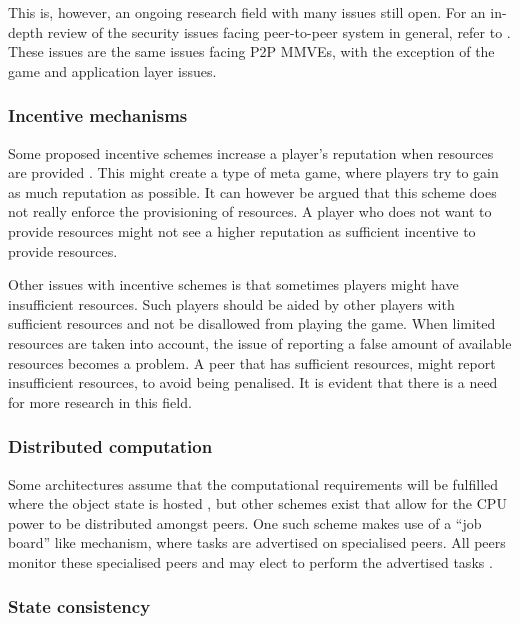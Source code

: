 This is, however, an ongoing research field with many issues still open. For an in-depth review of the security issues facing peer-to-peer system in general, refer to \cite{p2p_security_issues}. These issues are the same issues facing P2P MMVEs, with the exception of the game and application layer issues.

\subsubsection{Incentive mechanisms}

Some proposed incentive schemes increase a player's reputation when resources are provided  \cite{classic_p2p_reputation} \cite{proactive_reputation}. This might create a type of meta game, where players try to gain as much reputation as possible. It can however be argued that this scheme does not really enforce the provisioning of resources. A player who does not want to provide resources might not see a higher reputation as sufficient incentive to provide resources.

Other issues with incentive schemes is that sometimes players might have insufficient resources. Such players should be aided by other players with sufficient resources and not be disallowed from playing the game. When limited resources are taken into account, the issue of reporting a false amount of available resources becomes a problem. A peer that has sufficient resources, might report insufficient resources, to avoid being penalised. It is evident that there is a need for more research in this field.

\subsubsection{Distributed computation}
\label{distributed_computing_challenge}

Some architectures assume that the computational requirements will be fulfilled where the object state is hosted \cite{solipsis}, but other schemes exist that allow for the CPU power to be distributed amongst peers. One such scheme makes use of a ``job board'' like mechanism, where tasks are advertised on specialised peers. All peers monitor these specialised peers and may elect to perform the advertised tasks \cite{fan_mediator_paper}.

\subsubsection{State consistency}

